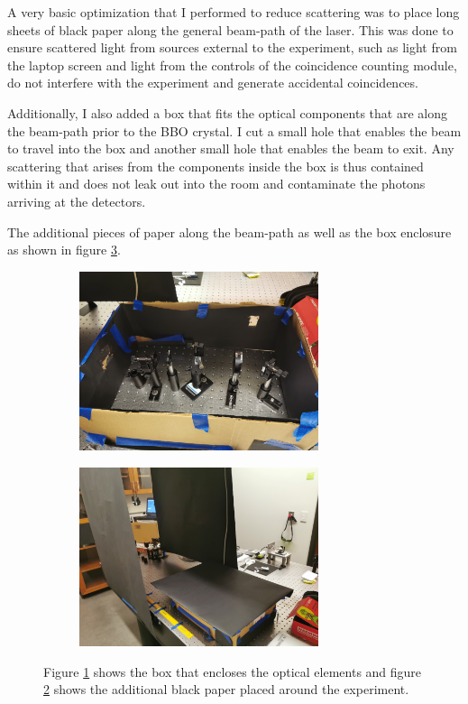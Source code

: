 \documentclass[letterpaper, 11 pt]{article}
\begin{document}
A very basic optimization that I performed to reduce scattering was to place
long sheets of black paper along the general beam-path of the laser. This was
done to ensure scattered light from sources external to the experiment, such as
light from the laptop screen and light from the controls of the coincidence
counting module, do not interfere with the experiment and generate accidental
coincidences.

Additionally, I also added a box that fits the optical components that are along
the beam-path prior to the BBO crystal. I cut a small hole that enables the beam
to travel into the box and another small hole that enables the beam to exit. Any
scattering that arises from the components inside the box is thus contained
within it and does not leak out into the room and contaminate the photons
arriving at the detectors. 

The additional pieces of paper along the beam-path as well as the box enclosure
as shown in figure \ref{fig:paper_scatter}.
\begin{figure}[H]%
    \centering
    \begin{subfigure}{.4\textwidth}
    \includegraphics[width=7cm]{black_box.jpg}
    \caption{ }
    \label{fig:box}
    \end{subfigure}
    \begin{subfigure}{.4\textwidth}
    \includegraphics[width = 7cm]{black_surround.jpg}
    \caption{ }
    \label{fig:rail}
    \end{subfigure}
    \caption{Figure \ref{fig:box} shows the box that encloses the optical elements
    and figure \ref{fig:rail} shows the additional black paper placed around the experiment.}
    \label{fig:paper_scatter}
\end{figure}
\end{document}
